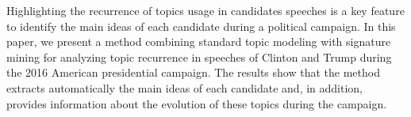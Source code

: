 Highlighting the recurrence of topics usage in candidates speeches is a key feature to identify the main ideas of each candidate during a political campaign. In this paper, we present a method combining standard topic modeling with signature mining for analyzing topic recurrence in speeches of Clinton and Trump during the 2016 American presidential campaign. The results show that the method extracts automatically the main ideas of each candidate and, in addition, provides information about the evolution of these topics during the campaign.
